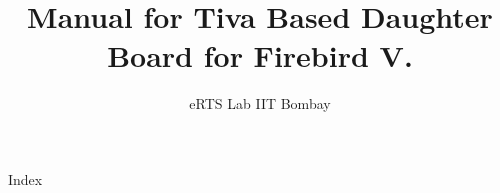 \documentclass[12pt]{article}
\title{\huge{\textbf{Manual for Tiva Based Daughter Board for Firebird V.}}}
\author{eRTS Lab IIT Bombay}
\begin{document}
	\maketitle
	\newpage
	\begin{section}
		Index
	\end{section}
\end{document}
